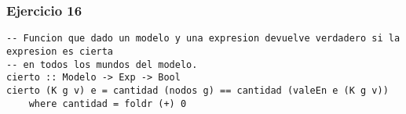 \subsubsection*{Ejercicio 16}
\begin{lstlisting}
-- Funcion que dado un modelo y una expresion devuelve verdadero si la expresion es cierta
-- en todos los mundos del modelo.
cierto :: Modelo -> Exp -> Bool
cierto (K g v) e = cantidad (nodos g) == cantidad (valeEn e (K g v))
	where cantidad = foldr (+) 0	
\end{lstlisting}
\vspace{1cm}
